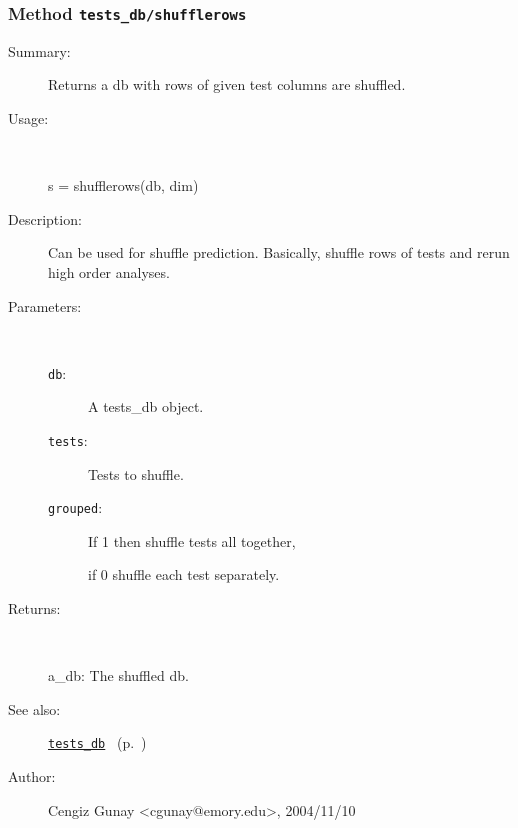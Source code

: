 \subsubsection[Method \texttt{shufflerows}]{Method \texttt{tests\_db/shufflerows}}%
%
\label{ref_tests_db__shufflerows}%
\hypertarget{ref_tests_db__shufflerows}{}%
\begin{description}
\item[Summary:]Returns a db with rows of given test columns are shuffled. 
%
\item[Usage:]~%
\begin{lyxcode}%
s = shufflerows(db, dim)
%
\end{lyxcode}%
%
\item[Description:]%
Can be used for shuffle prediction. Basically, shuffle rows of tests and rerun
 high order analyses. 
\item[Parameters:]~
\begin{description}%
\item[\texttt{db}:]
 A tests\_db object.
\item[\texttt{tests}:]
 Tests to shuffle.
\item[\texttt{grouped}:]
 If 1 then shuffle tests all together, 

if 0 shuffle each test separately.\end{description}%
%
\item[Returns:]~

	a\_db: The shuffled db.
%
%
\item[See also:]%
\hyperlink{ref_tests_db}{\texttt{tests\_db}}%
\ (p.~\pageref{ref_tests_db})%
%
%
\item[Author:]%
Cengiz Gunay <cgunay@emory.edu>, 2004/11/10%
\end{description}
\methodline%

